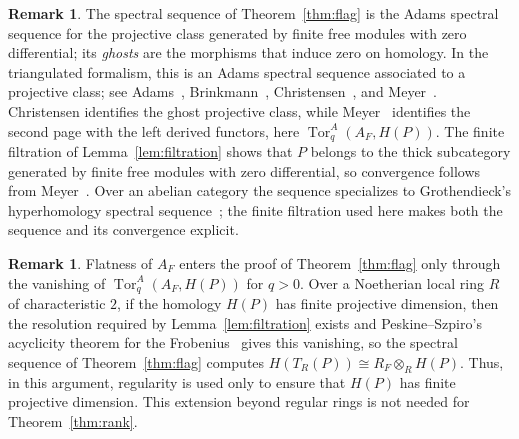\documentclass[11pt,reqno]{amsart}
\theoremstyle{plain}
\theoremstyle{definition}
\newtheorem{remark}[theorem]{Remark}
\DeclareMathOperator{\Tor}{Tor}
\newcommand{\Tate}{T}                 %
\newcommand{\Rone}{R_F}               %
\begin{document}
\begin{remark}\label{rem:abc}
The spectral sequence of Theorem~\ref{thm:flag} is the Adams spectral sequence for the projective
class generated by finite free modules with zero differential; its \emph{ghosts} are the morphisms
that induce zero on homology.  In the triangulated formalism, this is an Adams spectral sequence
associated to a projective class; see Adams~\cite{Adams}, Brinkmann~\cite{Brinkmann},
Christensen~\cite{Christensen}, and Meyer~\cite{Meyer}.  Christensen
\cite[\S8, Proposition~8.2]{Christensen} identifies the ghost
projective class, while Meyer~\cite[Theorem~4.3]{Meyer} identifies the second page with the left
derived functors, here $\Tor^A_q(A_F,H(P))$.  The finite filtration of
Lemma~\ref{lem:filtration} shows that $P$ belongs to the thick subcategory generated by finite free
modules with zero differential, so convergence follows from
Meyer~\cite[Proposition~4.5]{Meyer}.  Over an abelian category the sequence specializes to
Grothendieck's hyperhomology spectral sequence~\cite[\S6]{Meyer}; the finite filtration used here
makes both the sequence and its convergence explicit.
\end{remark}

\begin{remark}
Flatness of $A_F$ enters the proof of Theorem~\ref{thm:flag} only through the vanishing of
$\Tor^A_q(A_F,H(P))$ for $q>0$.  Over a Noetherian local ring $R$ of characteristic $2$, if the
homology $H(P)$ has finite projective dimension, then the resolution required by
Lemma~\ref{lem:filtration} exists and Peskine--Szpiro's acyclicity theorem for the
Frobenius~\cite[Chapter~I, Theorem~(1.7)]{PeskineSzpiro} gives this vanishing, so the spectral
sequence of Theorem~\ref{thm:flag} computes
$H(\Tate_R(P))\cong\Rone\otimes_RH(P)$.  Thus, in this argument, regularity is used only to ensure
that $H(P)$ has finite projective dimension.  This extension beyond regular rings is not needed for
Theorem~\ref{thm:rank}.
\end{remark}
\end{document}
